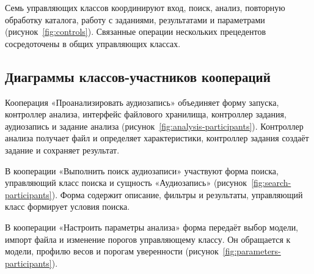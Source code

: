 Семь управляющих классов координируют вход, поиск, анализ, повторную
обработку каталога, работу с заданиями, результатами и параметрами
(рисунок~\ref{fig:controls}). Связанные операции нескольких прецедентов
сосредоточены в общих управляющих классах.

\clearpage

\subsection{Диаграммы классов-участников коопераций}

Кооперация «Проанализировать аудиозапись» объединяет форму запуска,
контроллер анализа, интерфейс файлового хранилища, контроллер задания,
аудиозапись и задание анализа (рисунок~\ref{fig:analysis-participants}).
Контроллер анализа получает файл и определяет характеристики,
контроллер задания создаёт задание и сохраняет результат.

\clearpage

В кооперации «Выполнить поиск аудиозаписи» участвуют форма поиска,
управляющий класс поиска и сущность «Аудиозапись»
(рисунок~\ref{fig:search-participants}). Форма содержит описание,
фильтры и результаты, управляющий класс формирует условия поиска.

\clearpage

В кооперации «Настроить параметры анализа» форма передаёт выбор модели,
импорт файла и изменение порогов управляющему классу. Он обращается
к модели, профилю весов и порогам уверенности
(рисунок~\ref{fig:parameters-participants}).


